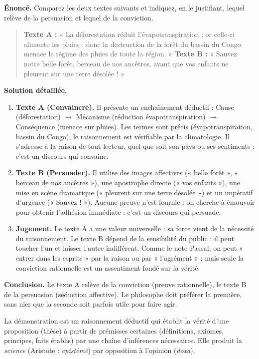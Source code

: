 \documentclass[11pt]{article}
\newcommand{\cle}[1]{{\popxbold\color{popdark}#1}}
\newcounter{popsec}
\newcounter{popsub}
\newcommand{\courssub}[1]{%
  \stepcounter{popsub}%
  \par\vspace{9pt}\noindent{\popxbold\fontsize{11.5}{13}\selectfont\color{popink}{\color{poporange}\thepopsec.\thepopsub}\hspace{6pt}#1}\par\nopagebreak\vspace{4pt}
}
\begin{document}
\begin{exoresolu}
\textbf{Énoncé.} Comparez les deux textes suivants et indiquez, en le justifiant, lequel relève de la persuasion et lequel de la conviction.
\begin{quote}
\textbf{Texte A :} « La déforestation réduit l'évapotranspiration ; or celle-ci alimente les pluies ; donc la destruction de la forêt du bassin du Congo menace le régime des pluies de toute la région. »
\textbf{Texte B :} « Sauvez notre belle forêt, berceau de nos ancêtres, avant que vos enfants ne pleurent sur une terre désolée ! »
\end{quote}
\tcblower
\textbf{Solution détaillée.}
\begin{enumerate}
\item \textbf{Texte A (Convaincre).} Il présente un enchaînement déductif : Cause (déforestation) $\rightarrow$ Mécanisme (réduction évapotranspiration) $\rightarrow$ Conséquence (menace sur pluies). Les termes sont précis (évapotranspiration, bassin du Congo), le raisonnement est vérifiable par la climatologie. Il s'adresse à la raison de tout lecteur, quel que soit son pays ou ses sentiments : c'est un discours qui \cle{convainc}.
\item \textbf{Texte B (Persuader).} Il utilise des images affectives (« belle forêt », « berceau de nos ancêtres »), une apostrophe directe (« vos enfants »), une mise en scène dramatique (« pleurent sur une terre désolée ») et un impératif d'urgence (« Sauvez ! »). Aucune preuve n'est fournie : on cherche à émouvoir pour obtenir l'adhésion immédiate : c'est un discours qui \cle{persuade}.
\item \textbf{Jugement.} Le texte A a une valeur universelle : sa force vient de la nécessité du raisonnement. Le texte B dépend de la sensibilité du public : il peut toucher l'un et laisser l'autre indifférent. Comme le note Pascal, on peut « entrer dans les esprits » par la raison ou par « l'agrément » ; mais seule la conviction rationnelle est un assentiment fondé sur la vérité.
\end{enumerate}
\textbf{Conclusion.} Le texte A relève de la conviction (preuve rationnelle), le texte B de la persuasion (séduction affective). Le philosophe doit préférer la première, sans nier que la seconde soit parfois utile pour faire agir.
\end{exoresolu}

\courssub{La démonstration}

\begin{definition}[Démonstration]
La \cle{démonstration} est un raisonnement déductif qui établit la vérité d'une proposition (thèse) à partir de prémisses certaines (définitions, axiomes, principes, faits établis) par une chaîne d'inférences nécessaires. Elle produit la \emph{science} (Aristote : \emph{epistémè}) par opposition à l'opinion (\emph{doxa}).
\end{definition}
\end{document}

